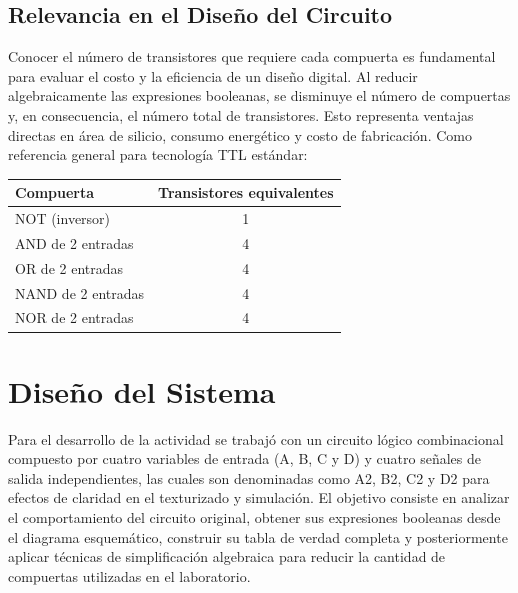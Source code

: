 \documentclass[12pt,letterpaper]{article}
\begin{document}
    \subsection{Relevancia en el Diseño del Circuito}
    
    Conocer el número de transistores que requiere cada compuerta es fundamental para evaluar
    el costo y la eficiencia de un diseño digital. Al reducir algebraicamente las expresiones
    booleanas, se disminuye el número de compuertas y, en consecuencia, el número total de
    transistores. Esto representa ventajas directas en área de silicio, consumo energético
    y costo de fabricación.
    \newpage
    Como referencia general para tecnología TTL estándar:
    
    \begin{center}
    \begin{tabular}{lc}
    \toprule
    \textbf{Compuerta} & \textbf{Transistores equivalentes} \\
    \midrule
    NOT (inversor)          & 1 \\
    AND de 2 entradas       & 4 \\
    OR de 2 entradas        & 4 \\
    NAND de 2 entradas      & 4 \\
    NOR de 2 entradas       & 4 \\
    \bottomrule
    \end{tabular}
    \end{center}
    \newpage
    \section{Diseño del Sistema}
     
    Para el desarrollo de la actividad se trabajó con un circuito lógico combinacional compuesto por cuatro variables de entrada (A, B, C y D) y cuatro señales de salida independientes, las cuales son denominadas como A2, B2, C2 y D2 para efectos de claridad en el texturizado y simulación. El objetivo consiste en analizar el comportamiento del circuito original, obtener sus expresiones booleanas desde el diagrama esquemático, construir su tabla de verdad completa y posteriormente aplicar técnicas de simplificación algebraica para reducir la cantidad de compuertas utilizadas en el laboratorio.
\end{document}
